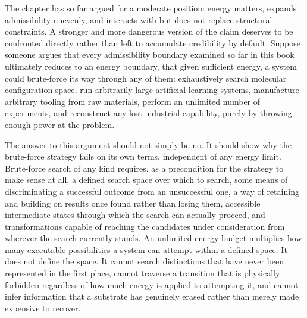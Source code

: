 \documentclass[11pt]{book}
\begin{document}
The chapter has so far argued for a moderate position: energy matters, expands admissibility unevenly, and interacts with but does not replace structural constraints. A stronger and more dangerous version of the claim deserves to be confronted directly rather than left to accumulate credibility by default. Suppose someone argues that every admissibility boundary examined so far in this book ultimately reduces to an energy boundary, that given sufficient energy, a system could brute-force its way through any of them: exhaustively search molecular configuration space, run arbitrarily large artificial learning systems, manufacture arbitrary tooling from raw materials, perform an unlimited number of experiments, and reconstruct any lost industrial capability, purely by throwing enough power at the problem.

The answer to this argument should not simply be no. It should show why the brute-force strategy fails on its own terms, independent of any energy limit. Brute-force search of any kind requires, as a precondition for the strategy to make sense at all, a defined search space over which to search, some means of discriminating a successful outcome from an unsuccessful one, a way of retaining and building on results once found rather than losing them, accessible intermediate states through which the search can actually proceed, and transformations capable of reaching the candidates under consideration from wherever the search currently stands. An unlimited energy budget multiplies how many executable possibilities a system can attempt within a defined space. It does not define the space. It cannot search distinctions that have never been represented in the first place, cannot traverse a transition that is physically forbidden regardless of how much energy is applied to attempting it, and cannot infer information that a substrate has genuinely erased rather than merely made expensive to recover.
\end{document}
